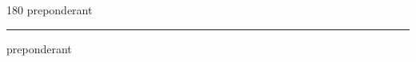 
\begin{frame}
\begin{center}
\begin{turn}{180}
{\fontsize{2.5cm}{1em}\selectfont preponderant}
\end{turn}
\vspace{1em}\par  
\hrule
\vspace{1em}\par  
{\fontsize{2.5cm}{1em}\selectfont preponderant}
\end{center}
\end{frame}
